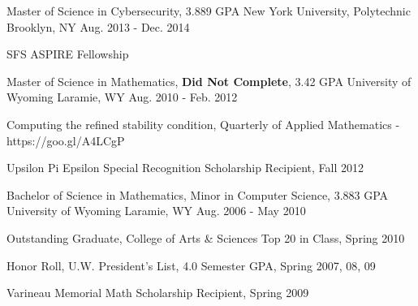 


\begin{cventries}

\cventry
{Master of Science in Cybersecurity, 3.889 GPA} %
{New York University, Polytechnic} %
{Brooklyn, NY} %
{Aug. 2013 - Dec. 2014} %
{
\begin{cvitems}
\item {SFS ASPIRE Fellowship}
\end{cvitems}
}

\cventry
{Master of Science in Mathematics, \textbf{Did Not Complete}, 3.42 GPA} %
{University of Wyoming} %
{Laramie, WY} %
{Aug. 2010 - Feb. 2012} %
{
\begin{cvitems}
\item{Computing the refined stability condition, Quarterly of Applied Mathematics - https://goo.gl/A4LCgP}
\item {Upsilon Pi Epsilon Special Recognition Scholarship Recipient, Fall 2012}
\end{cvitems}
}

\cventry
{Bachelor of Science in Mathematics, Minor in Computer Science, 3.883 GPA} %
{University of Wyoming} %
{Laramie, WY} %
{Aug. 2006 - May 2010} %
{
\begin{cvitems}
\item {Outstanding Graduate, College of Arts \& Sciences Top 20 in Class, Spring 2010}
\item {Honor Roll, U.W. President’s List, 4.0 Semester GPA, Spring 2007, 08, 09}
\item {Varineau Memorial Math Scholarship Recipient, Spring 2009}
\end{cvitems}
}


\end{cventries}